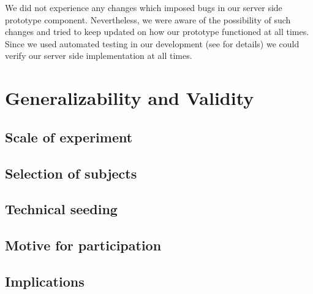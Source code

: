 We did not experience any changes which imposed bugs in our server side
prototype component. Nevertheless, we were aware of the possibility of such
changes and tried to keep updated on how our prototype functioned at all
times. Since we used automated testing in our development (see
 for details) we could verify
our server side implementation at all times.

\section{Generalizability and Validity}

\subsection{Scale of experiment}


\subsection{Selection of subjects}


\subsection{Technical seeding}


\subsection{Motive for participation}


\subsection{Implications}

